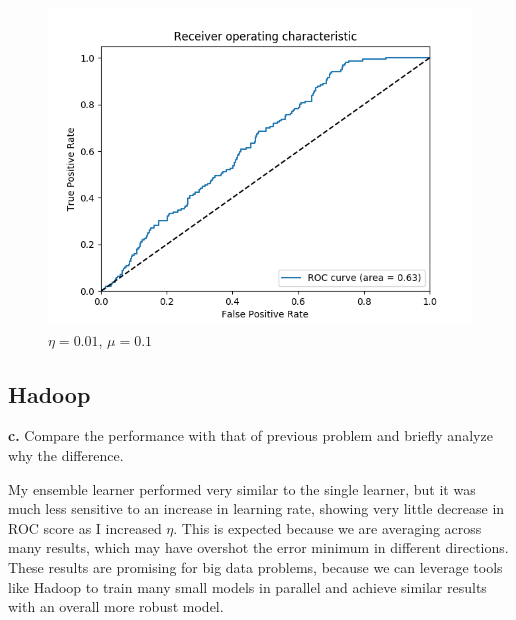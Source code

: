 \documentclass[12pt]{article}
\begin{document}
\begin{figure}[!h]
\centering
\includegraphics[width=12cm]{roc_01_90}
\caption{$\eta = 0.01$, $\mu=0.1$}
\end{figure}


\pagebreak

\subsection{Hadoop}
\textbf{c.} Compare the performance with that of previous problem and briefly analyze why the difference.

\vspace{5mm}
My ensemble learner performed very similar to the single learner, but it was
much less sensitive to an increase in learning rate, showing very little
decrease in ROC score as I increased $\eta$.  This is expected because we are
averaging across many results, which may have overshot the error minimum in
different directions.  These results are promising for big data problems,
because we can leverage tools like Hadoop to train many small models in parallel
and achieve similar results with an overall more robust model.
\end{document}
